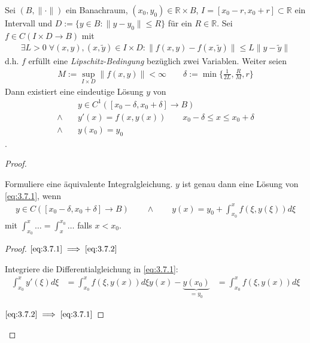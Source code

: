 \begin{theorem} \label{thm:3.7}
  Sei $(B, \|\cdot\|)$ ein Banachraum, $(x_0,y_0) \in \mathbb{R} \times B$, $I=[x_0-r, x_0+r] \subset \mathbb{R}$ ein Intervall und $D := \{y \in B : \|y-y_0\| \le R\}$ für ein $R \in \mathbb{R}$.
  Sei $f \in C(I \times D \to B)$ mit
  \begin{align*}
    \exists L > 0 \; \forall(x,y), (x,\tilde y) \in I \times D : \|f(x,y) - f(x,\tilde y) \| \le L\|y-\tilde y\|
  \end{align*}
  d.h. $f$ erfüllt eine \emph{Lipschitz-Bedingung} bezüglich zwei Variablen.
  Weiter seien
  \begin{align*}
    M := \sup_{I \times D} \|f(x,y)\| < \infty
    \qquad
    \delta := \min \bigg\{ \frac 1{2L}, \frac RM, r \bigg\}
  \end{align*}
  Dann existiert eine eindeutige Lösung $y$ von
  \begin{align} \label{eq:3.7.1}
    &\quad y \in C^1([x_0 - \delta, x_0 + \delta] \to B) \\
    \land&\quad y'(x) = f(x,y(x)) \qquad x_0 - \delta \le x \le x_0 + \delta \\
    \land&\quad y(x_0)=y_0
  \end{align}
  .
  \begin{proof}
    \begin{enum-arab}
    \item
      Formuliere eine äquivalente Integralgleichung.
      $y$ ist genau dann eine Lösung von \eqref{eq:3.7.1}, wenn
      \begin{align} \label{eq:3.7.2}
        y \in C ( [x_0 - \delta, x_0 + \delta] \to B)
        \qquad \land \qquad
        y(x) = y_0 + \int_{x_0}^x f(\xi, y(\xi)) d\xi
      \end{align}
      mit $\int_{x_0}^{x} \dotso = \int_x^{x_0} \dotso$ falls $x < x_0$.
      \begin{proof}
        $\eqref{eq:3.7.1} \implies \eqref{eq:3.7.2}$

        Integriere die Differentialgleichung in \eqref{eq:3.7.1}:
        \begin{align*}
          \int_{x_0}^x y'(\xi) d\xi &= \int_{x_0}^x f(\xi, y(x)) d\xi
          y(x) - \underbrace{y(x_0)}_{=y_0} &= \int_{x_0}^x f(\xi, y(x)) d\xi
        \end{align*}

        $\eqref{eq:3.7.2} \implies \eqref{eq:3.7.1}$


\end{proof}
\end{enum-arab}
\end{proof}
\end{theorem}
